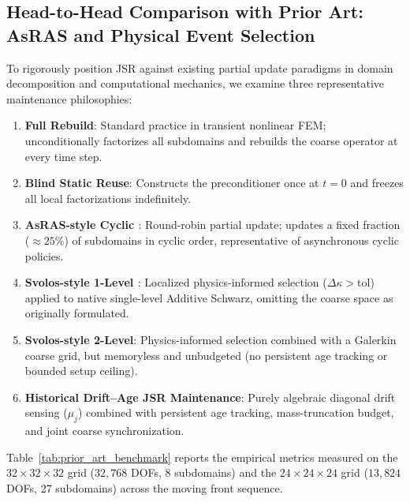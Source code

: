 \documentclass[preprint,12pt,3p]{elsarticle}
\begin{document}
\subsection{Head-to-Head Comparison with Prior Art: AsRAS and Physical Event Selection}
\label{subsec:prior_art_comparison}

To rigorously position JSR against existing partial update paradigms in domain decomposition and computational mechanics, we examine three representative maintenance philosophies:
\begin{enumerate}
    \item \textbf{Full Rebuild}: Standard practice in transient nonlinear FEM; unconditionally factorizes all subdomains and rebuilds the coarse operator at every time step.
    \item \textbf{Blind Static Reuse}: Constructs the preconditioner once at $t=0$ and freezes all local factorizations indefinitely.
    \item \textbf{AsRAS-style Cyclic \cite{berenguer2015asynchronous}}: Round-robin partial update; updates a fixed fraction ($\approx 25\%$) of subdomains in cyclic order, representative of asynchronous cyclic policies.
    \item \textbf{Svolos-style 1-Level \cite{svolos2020updating}}: Localized physics-informed selection ($\Delta \kappa > \text{tol}$) applied to native single-level Additive Schwarz, omitting the coarse space as originally formulated.
    \item \textbf{Svolos-style 2-Level}: Physics-informed selection combined with a Galerkin coarse grid, but memoryless and unbudgeted (no persistent age tracking or bounded setup ceiling).
    \item \textbf{Historical Drift--Age JSR Maintenance}: Purely algebraic diagonal drift sensing ($\mu_j$) combined with persistent age tracking, mass-truncation budget, and joint coarse synchronization.
\end{enumerate}

Table~\ref{tab:prior_art_benchmark} reports the empirical metrics measured on the $32 \times 32 \times 32$ grid ($32,768$ DOFs, 8 subdomains) and the $24 \times 24 \times 24$ grid ($13,824$ DOFs, 27 subdomains) across the moving front sequence.
\end{document}
